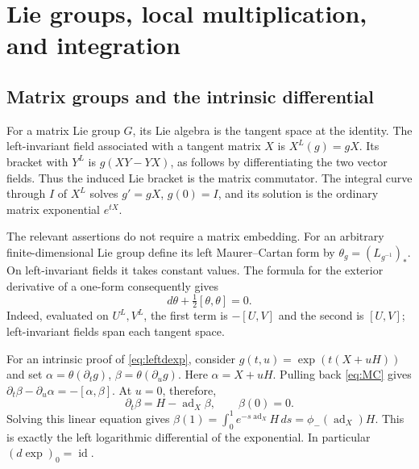 \documentclass[11pt]{article}
\numberwithin{equation}{section}
\theoremstyle{definition}
\theoremstyle{remark}
\DeclareMathOperator{\ad}{ad}
\DeclareMathOperator{\id}{id}
\begin{document}
\section{Lie groups, local multiplication, and integration}
\label{sec:localgroups}
\subsection{Matrix groups and the intrinsic differential}
For a matrix Lie group $G$, its Lie algebra is the tangent space at
the identity. The left-invariant field associated with a tangent
matrix $X$ is $X^L(g)=gX$. Its bracket with $Y^L$ is
$g(XY-YX)$, as follows by differentiating the two vector fields.
Thus the induced Lie bracket is the matrix commutator. The integral
curve through $I$ of $X^L$ solves $g'=gX$, $g(0)=I$, and its
solution is the ordinary matrix exponential $e^{tX}$.

The relevant assertions do not require a matrix embedding. For an
arbitrary finite-dimensional Lie group define its left
Maurer--Cartan form by $\theta_g=(L_{g^{-1}})_*$. On left-invariant
fields it takes constant values. The formula for the exterior
derivative of a one-form consequently gives
\begin{equation}\label{eq:MC}
 d\theta+\tfrac12[\theta,\theta]=0.
\end{equation}
Indeed, evaluated on $U^L,V^L$, the first term is $-[U,V]$ and the
second is $[U,V]$; left-invariant fields span each tangent space.

For an intrinsic proof of \eqref{eq:leftdexp}, consider
$g(t,u)=\exp(t(X+uH))$ and set
$\alpha=\theta(\partial_tg)$, $\beta=\theta(\partial_ug)$.
Here $\alpha=X+uH$. Pulling back \eqref{eq:MC} gives
$\partial_t\beta-\partial_u\alpha=-[\alpha,\beta]$.
At $u=0$, therefore,
\[
 \partial_t\beta=H-\ad_X\beta,\qquad\beta(0)=0.
\]
Solving this linear equation gives
$\beta(1)=\int_0^1e^{-s\ad_X}H\,ds=\phi_-(\ad_X)H$.
This is exactly the left logarithmic differential of the exponential.
In particular $(d\exp)_0=\id$.
\end{document}
